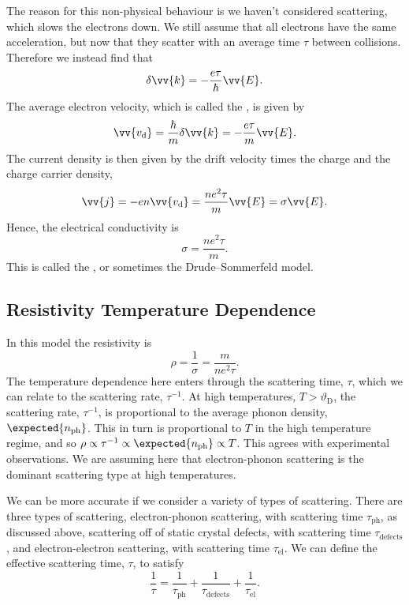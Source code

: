 \documentclass[fleqn]{NotesClass}
\newcommand*{\debye}{\mathrm{D}}
\begin{document}
    The reason for this non-physical behaviour is we haven't considered scattering, which slows the electrons down.
    We still assume that all electrons have the same acceleration, but now that they scatter with an average time \(\tau\) between collisions.
    Therefore we instead find that
    \begin{equation}
        \delta\vv{k} = -\frac{e\tau}{\hbar}\vv{E}.
    \end{equation}
    The average electron velocity, which is called the , is given by
    \begin{equation}
        \vv{v_{\mathrm{d}}} = \frac{\hbar}{m}\delta\vv{k} = -\frac{e\tau}{m}\vv{E}.
    \end{equation}
    The current density is then given by the drift velocity times the charge and the charge carrier density,
    \begin{equation}
        \vv{j} = -en\vv{v_{\mathrm{d}}} = \frac{ne^2\tau}{m}\vv{E} = \sigma\vv{E}.
    \end{equation}
    Hence, the electrical conductivity is
    \begin{equation}
        \sigma = \frac{ne^2\tau}{m}.
    \end{equation}
    This is called the , or sometimes the Drude--Sommerfeld model.
    
    \subsection{Resistivity Temperature Dependence}
    In this model the resistivity is
    \begin{equation}
        \rho = \frac{1}{\sigma} = \frac{m}{ne^2\tau}.
    \end{equation}
    The temperature dependence here enters through the scattering time, \(\tau\), which we can relate to the scattering rate, \(\tau^{-1}\).
    At high temperatures, \(T > \vartheta_{\debye}\), the scattering rate, \(\tau^{-1}\), is proportional to the average phonon density, \(\expected{n_{\mathrm{ph}}}\).
    This in turn is proportional to \(T\) in the high temperature regime, and so \(\rho \propto \tau^{-1} \propto \expected{n_{\mathrm{ph}}} \propto T\).
    This agrees with experimental observations.
    We are assuming here that electron-phonon scattering is the dominant scattering type at high temperatures.
    
    We can be more accurate if we consider a variety of types of scattering.
    There are three types of scattering, electron-phonon scattering, with scattering time \(\tau_{\mathrm{ph}}\), as discussed above, scattering off of static crystal defects, with scattering time \(\tau_{\mathrm{defects}}\), and electron-electron scattering, with scattering time \(\tau_{\mathrm{el}}\).
    We can define the effective scattering time, \(\tau\), to satisfy
    \begin{equation}
        \frac{1}{\tau} = \frac{1}{\tau_{\mathrm{ph}}} + \frac{1}{\tau_{\mathrm{defects}}} + \frac{1}{\tau_{\mathrm{el}}}.
    \end{equation}
    
\end{document}
